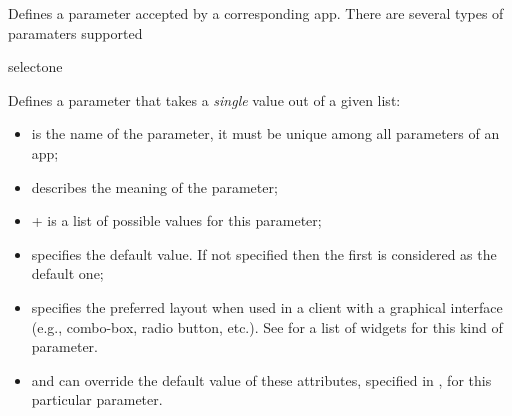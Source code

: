 \bigskip
{}
{
%
  Defines a parameter accepted by a corresponding app. There are
  several types of paramaters supported
%
}
{}

\bigskip
\xmlstruct
{selectone}
{
%
  Defines a parameter that takes a \emph{single} value out of a given
  list:

  \begin{itemize}
  \item {} is the name of the parameter, it must be
    unique among all parameters of an app;

  \item {} describes the meaning of the parameter;

  \item {}+ is a list of possible values for
    this parameter;

  \item {} specifies the default
    value. If not specified then the first 
    is considered as the default one;

  \item {} specifies the preferred layout when
    used in a client with a graphical interface (e.g., combo-box,
    radio button, etc.). See  for a list of
    widgets for this kind of parameter.
\item {} and  can override the default value of these attributes, specified in , for this particular parameter.
  \end{itemize}
 } {}

